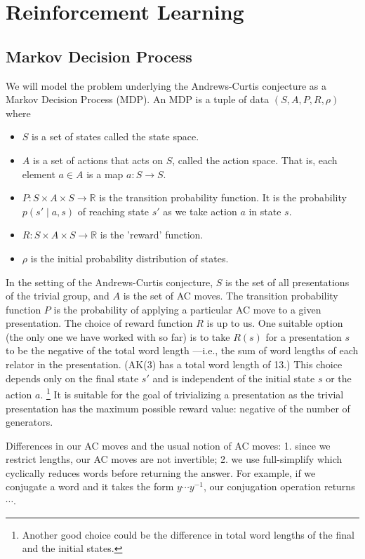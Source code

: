 
\section{Reinforcement Learning}

\subsection{Markov Decision Process}

We will model the problem underlying the Andrews-Curtis conjecture as a Markov Decision Process (MDP).
An MDP is a tuple of data $(S, A, P, R, \rho)$ where
\begin{itemize}
	\item $S$ is a set of states called the state space.
	\item $A$ is a set of actions that acts on $S$, called the action space.
	That is, each element $a \in A$ is a map $a: S \to S$.
	\item $P: S \times A \times S \to \mathbb{R}$ is the transition
	probability function.
	It is the probability $p (s' \mid a, s)$ of reaching
	state $s'$ as we take action $a$ in state $s$.
	\item $R: S \times A \times S \to \mathbb{R}$ is the 'reward' function.
	\item $\rho$ is the initial probability distribution of states.
\end{itemize}

In the setting of the Andrews-Curtis conjecture, $S$ is the set of all presentations of the trivial group, and $A$ is the set of AC moves.
The transition probability function $P$ is the probability of applying a particular AC move to a given presentation.
The choice of reward function $R$ is up to us.
One suitable option (the only one we have worked with so far) is to take $R(s)$ for a presentation $s$ to be the negative of the total word length ---i.e., the sum of word lengths of each relator in the presentation.
(AK(3) has a total word length of 13.)
This choice depends only on the final state $s'$ and is independent of the initial state $s$
or the action $a$.
\footnote{Another good choice could be the difference in total word lengths of the final and the initial states.} It is suitable for the goal of trivializing a presentation as the trivial presentation has the maximum possible reward value: negative of the number of generators.

Differences in our AC moves and the usual notion of AC moves: 1.
since we restrict lengths, our AC moves are not invertible; 2.
we use full-simplify which cyclically reduces words before returning the answer.
For example, if we conjugate a word and it takes the form $y \cdots y^{-1}$, our conjugation operation returns $\cdots$.


